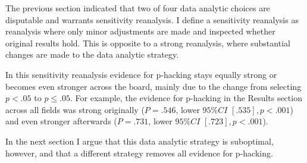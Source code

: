 The previous section indicated that two of four data analytic choices are disputable and warrants sensitivity reanalysis. I define a sensitivity reanalysis as reanalysis where only minor adjustments are made and inspected whether original results hold. This is opposite to a strong reanalysis, where substantial changes are made to the data analytic strategy.

In this sensitivity reanalysis evidence for p-hacking stays equally strong or becomes even stronger across the board, mainly due to the change from selecting $p<.05$ to $p\leq.05$. For example, the evidence for p-hacking in the Results section across all fields was strong originally ($P=.546$, lower $95\%CI$ $[.535],p<.001$) and even stronger afterwards ($P=.731$, lower $95\%CI$ $[.723],p<.001$).

In the next section I argue that this data analytic strategy is suboptimal, however, and that a different strategy removes all evidence for p-hacking.
